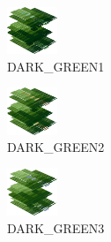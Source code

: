 \hspace{0.1cm}
\begin{minipage}[b]{0.15\linewidth}
\begin{figure}[H]                                                          
  \centering                                                             
  \begin{adjustbox}{width=1.5cm,center}                                   
  \includegraphics[width=1.5cm]{src/colorspace_colourflow/flows/colourflow_209-45.png}%
  \end{adjustbox}                                                        
\caption*{DARK\_GREEN1}                                           
\end{figure}                                                               
\end{minipage}
\hspace{0.1cm}
\begin{minipage}[b]{0.15\linewidth}
\begin{figure}[H]                                                          
  \centering                                                             
  \begin{adjustbox}{width=1.5cm,center}                                   
  \includegraphics[width=1.5cm]{src/colorspace_colourflow/flows/colourflow_210-45.png}%
  \end{adjustbox}                                                        
\caption*{DARK\_GREEN2}                                           
\end{figure}                                                               
\end{minipage}
\hspace{0.1cm}
\begin{minipage}[b]{0.15\linewidth}
\begin{figure}[H]                                                          
  \centering                                                             
  \begin{adjustbox}{width=1.5cm,center}                                   
  \includegraphics[width=1.5cm]{src/colorspace_colourflow/flows/colourflow_211-45.png}%
  \end{adjustbox}                                                        
\caption*{DARK\_GREEN3}                                           
\end{figure}                                                               
\end{minipage}
